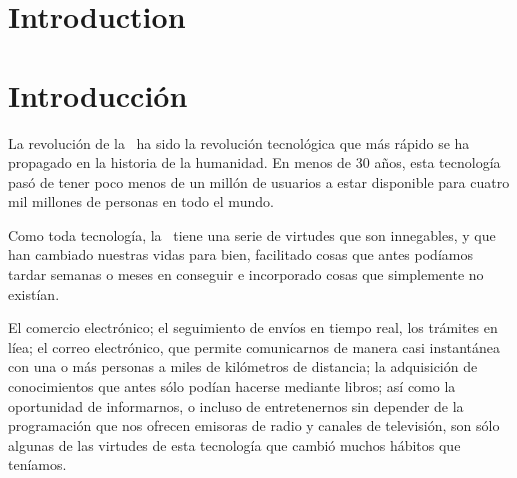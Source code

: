 \ifdefined\inglese
{}
\chapter*[Introduction]{Introduction}




\begin{comment}
+webDescription
Generic content
-webDescription
\end{comment}

\fi


\ifdefined\espanol
{}
\chapter*[Introducci\'on]{Introducci\'on}



La revoluci\'on de la \internet\ ha sido la revoluci\'on tecnol\'ogica que
m\'as r\'apido se ha propagado en la historia de la humanidad. 
En menos de 30 a\~nos, esta tecnolog\'ia pas\'o de tener 
poco menos de un mill\'on de usuarios
a estar disponible para cuatro mil millones de personas en todo el mundo.

Como toda tecnolog\'ia, 
la \internet\ tiene una serie de virtudes que son innegables,
y que han cambiado nuestras vidas para bien, facilitado cosas que antes pod\'iamos 
tardar semanas o meses en conseguir e incorporado cosas que simplemente no exist\'ian. 

El comercio electr\'onico; el seguimiento de env\'ios en tiempo real,
los tr\'amites en l\'iea; el correo electr\'onico, que permite
comunicarnos de manera casi instant\'anea con una o m\'as personas a
miles de kil\'ometros de distancia; la adquisici\'on de conocimientos
que antes s\'olo pod\'ian hacerse mediante libros; as\'i como la
oportunidad de informarnos, o incluso de entretenernos sin depender de
la programaci\'on que nos ofrecen emisoras de radio y canales de
televisi\'on, son s\'olo algunas de las virtudes de esta tecnolog\'ia
que cambi\'o muchos h\'abitos que ten\'iamos.

